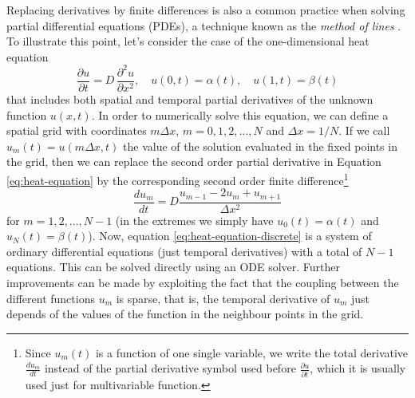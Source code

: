  

Replacing derivatives by finite differences is also a common practice when solving partial differential equations (PDEs), a technique known as the \textit{method of lines} \cite{ascher2008numerical}. 
To illustrate this point, let's consider the case of the one-dimensional heat equation
\begin{equation}
 \frac{\partial u}{\partial t}
 = 
 D \, 
 \frac{\partial^2 u}{\partial x^2}, 
 \quad u(0, t) = \alpha(t), 
 \quad u(1, t) = \beta(t)
 \label{eq:heat-equation}
\end{equation}
that includes both spatial and temporal partial derivatives of the unknown function $u(x, t)$.
In order to numerically solve this equation, we can define a spatial grid with coordinates $m \Delta x$, $m=0, 1, 2, \ldots, N$ and $\Delta x = 1 / N$.
If we call $u_m(t) = u(m \Delta x, t)$ the value of the solution evaluated in the fixed points in the grid, then we can replace the second order partial derivative in Equation \eqref{eq:heat-equation} by the corresponding second order finite difference\footnote{Since $u_m(t)$ is a function of one single variable, we write the total derivative $\frac{du_m}{dt}$ instead of the partial derivative symbol used before $\frac{\partial u}{\partial t}$, which it is usually used just for multivariable function.}
\begin{equation}
 \frac{d u_m}{dt} 
 = 
 D 
 \frac{u_{m-1} - 2u_m + u_{m+1}}{\Delta x^2}
 \label{eq:heat-equation-discrete}
\end{equation}
for $m = 1, 2, \ldots, N-1$ (in the extremes we simply have $u_0(t) = \alpha(t)$ and $u_N(t)=\beta(t)$).
Now, equation \eqref{eq:heat-equation-discrete} is a system of ordinary differential equations (just temporal derivatives) with a total of $N-1$ equations.
This can be solved directly using an ODE solver.
Further improvements can be made by exploiting the fact that the coupling between the different functions $u_m$ is sparse, that is, the temporal derivative of $u_m$ just depends of the values of the function in the neighbour points in the grid.

